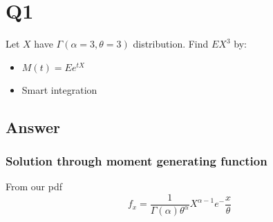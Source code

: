 \documentclass[]{article}
\title{}
\author{}
\begin{document}
\maketitle

\section{Q1}

Let $X$ have $\Gamma(\alpha = 3, \theta = 3)$ distribution.
Find $EX^3$ by:

\begin{itemize}
	\item $M(t) = Ee^{tX}$
	\item Smart integration
\end{itemize}

\subsection{Answer}

\subsubsection{Solution through moment generating function}

From our pdf 
\begin{equation}
	f_x = \frac{1}{\Gamma(\alpha) \theta^{\alpha}} X^{\alpha-1}e^-\frac{x}{\theta}
\end{equation}
\end{document}
